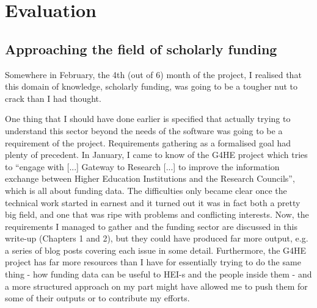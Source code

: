 \chapter{Evaluation}




\section{Approaching the field of scholarly funding}
\label{eval-difficult-field}
Somewhere in February, the 4th (out of 6) month of the project, I realised that this domain of knowledge, scholarly funding, was going to be a tougher nut to crack than I had thought.

One thing that I should have done earlier is specified that actually trying to understand this sector beyond the needs of the software was going to be a requirement of the project. Requirements gathering as a formalised goal had plenty of precedent. In January, I came to know of the G4HE project which tries to ``engage with [...] Gateway to Research [...] to improve the information exchange between Higher Education Institutions and the Research Councils'', which is all about funding data. The difficulties only became clear once the technical work started in earnest and it turned out it was in fact both a pretty big field, and one that was ripe with problems and conflicting interests. Now, the requirements I managed to gather and the funding sector are discussed in this write-up (Chapters 1 and 2), but they could have produced far more output, e.g. a series of blog posts covering each issue in some detail. Furthermore, the G4HE project has far more resources than I have for essentially trying to do the same thing - how funding data can be useful to HEI-s and the people inside them - and a more structured approach on my part might have allowed me to push them for some of their outputs or to contribute my efforts.

